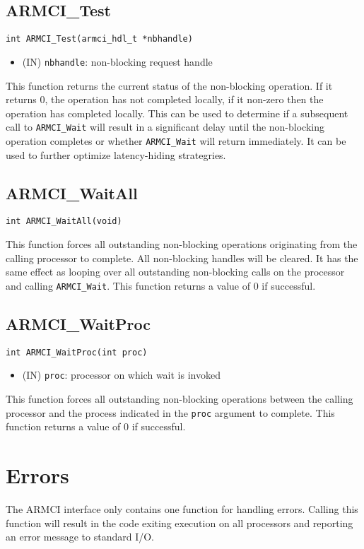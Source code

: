 \documentclass[12pt]{article}
\begin{document}
\subsection{ARMCI\_Test}
\begin{verbatim}
int ARMCI_Test(armci_hdl_t *nbhandle)
\end{verbatim}
\begin{itemize}
\item (IN) \texttt{nbhandle}: non-blocking request handle
\end{itemize}
This function returns the current status of the non-blocking operation. If it
returns 0, the operation has not completed locally, if it non-zero then the
operation has completed locally. This can be used to determine if a subsequent
call to \texttt{ARMCI\_Wait} will result in a significant delay until the non-blocking
operation completes or whether \texttt{ARMCI\_Wait} will return immediately. It can be
used to further optimize latency-hiding strategries.

\subsection{ARMCI\_WaitAll}
\begin{verbatim}
int ARMCI_WaitAll(void)
\end{verbatim}
This function forces all outstanding non-blocking operations originating from
the calling processor to complete. All non-blocking handles will be cleared. It
has the same effect as looping over all outstanding non-blocking calls on the
processor and calling \texttt{ARMCI\_Wait}. This function returns a value of 0 if
successful.

\subsection{ARMCI\_WaitProc}
\begin{verbatim}
int ARMCI_WaitProc(int proc)
\end{verbatim}
\begin{itemize}
\item (IN) \texttt{proc}: processor on which wait is invoked
\end{itemize}
This function forces all outstanding non-blocking operations between the calling
processor and the process indicated in the \texttt{proc} argument to complete.
This function returns a value of 0 if successful.

\section{Errors}
The ARMCI interface only contains one function for handling errors. Calling this
function will result in the code exiting execution on all processors and
reporting an error message to standard I/O.
\end{document}

